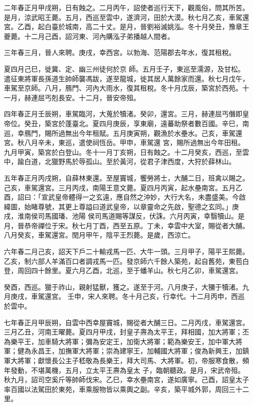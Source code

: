 \begin{pinyinscope}
 二年春正月甲戌朔，日有蝕之。二月丙午，詔使者巡行天下，觀風俗，問其所苦。是月，涼武昭王薨。五月，西巡至雲中，遂濟河，田於大漠。秋七月乙亥，車駕還宮。乙酉，起白臺於城南，高二十丈。是月，晉劉裕滅姚泓。冬十月癸丑，豫章王夔薨。十二月己酉，詔河東、河內購泓子弟播越人間者。



 三年春三月，晉人來聘。庚戌，幸西宮。以勃海、范陽郡去年水，復其租稅。



 夏四月己巳，徙冀、定、幽三州徒何於京
 師。五月壬子，東巡至濡源，及甘松。遣征東將軍長孫道生帥師襲馮跋，遂至龍城，徙其居人萬餘家而還。秋七月戊午，車駕至京師。八月，鴈門、河內大雨水，復其租稅。冬十月戊辰，築宮於西苑。十一月，赫連屈丐剋長安。十二月，晉安帝殂。



 四年春正月壬辰朔，車駕臨河，大蒐於犢渚。癸卯，還宮。三月，赫連屈丐僭即皇帝位。癸丑，築宮於蓬臺北。夏四月庚辰，享東廟，遠蕃助祭者數百國。辛巳，南巡，幸鴈門，賜所過無出今年租賦。五月庚寅朔，觀漁於水壘水。己亥，車駕還宮。秋八月辛未，東巡，遣使祠恆岳。甲申，車駕還
 宮，賜所過無出今年田租。九月甲寅，築宮於白登山。冬十一月丁亥朔，日有蝕之。十二月癸亥，西巡，至雲中，踰白道，北獵野馬於辱孤山。至於黃河，從君子津西度，大狩於薛林山。



 五年春正月丙戌朔，自薛林東還。至屋竇城，饗勞將士，大酺二日，班禽以賜之。己亥，車駕還宮。三月丙戌，南陽王意文薨。夏四月丙寅，起水壘南宮。五月乙酉，詔曰：「宣武皇帝體得一之玄遠，應自然之沖妙，大行大名，未盡盛美。今啟緯圖，始睹尊號，其更上尊謚曰道武皇帝，以章靈命之先啟，聖德之玄同。」庚戌，淮南侯司馬國璠、池陽
 侯司馬道賜等謀反，伏誅。六月丙寅，幸翳犢山。是月，晉恭帝禪位于宋。秋七月丁酉，西至五原。丁未，幸雲中大室，賜從者大酺。八月癸亥，車駕還宮。閏月甲午，陰平王烈薨。是歲，西涼亡。



 六年春二月己亥，詔天下戶二十輸戎馬一匹、大牛一頭。三月甲子，陽平王熙薨。乙亥，制六部人羊滿百口者調戎馬一匹。發京師六千餘人築苑，起自舊苑，東苞白登，周回四十餘里。夏六月乙酉，北巡，至于蟠羊山。秋七月乙卯，車駕還宮。



 癸酉，西巡。獵于祚山，親射猛獸，獲之。遂至于河。八月庚子，大獼于犢渚。九月庚戌，車駕還宮。
 壬申，宋人來聘。冬十月己亥，行幸代。十二月丙申，西巡於雲中。



 七年春正月甲辰朔，自雲中西幸屋竇城，賜從者大酺三日。二月丙戌，車駕還宮。三月乙丑，河南王曜薨。夏四月甲戌，封皇子燾為太平王，拜相國，加大將軍；丕為樂平王，加車騎大將軍；彌為安定王，加衛大將軍；範為樂安王，加中軍大將軍；健為永昌王，加撫軍大將軍；崇為建寧王，加輔國大將軍；俊為新興王，加鎮軍大將軍；獻懷長公主子嵇敬為長樂王，拜大司馬、大將軍。初，帝服寒食散，頻年發動，不堪萬機，五月，立太平王燾為皇太
 子，臨朝聽政。是月，宋武帝殂。秋九月，詔司空奚斤等帥師伐宋。乙巳，幸水壘南宮，遂如廣寧。己酉，詔皇太子率百國以法駕田於東苑，車乘服物皆以乘輿之副。辛亥，築平城外郭，周回三十二里。




\end{pinyinscope}
